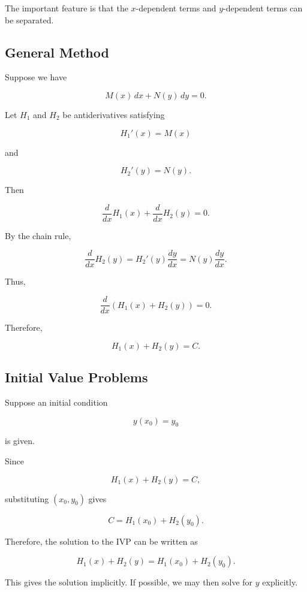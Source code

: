 \documentclass[11pt]{article}
\begin{document}
The important feature is that the $x$-dependent terms and
$y$-dependent terms can be separated.

\subsection{General Method}

Suppose we have

\[
M(x)\,dx+N(y)\,dy=0.
\]

Let $H_1$ and $H_2$ be antiderivatives satisfying

\[
H_1'(x)=M(x)
\]

and

\[
H_2'(y)=N(y).
\]

Then

\[
\frac{d}{dx}H_1(x)
+
\frac{d}{dx}H_2(y)=0.
\]

By the chain rule,

\[
\frac{d}{dx}H_2(y)
=
H_2'(y)\frac{dy}{dx}
=
N(y)\frac{dy}{dx}.
\]

Thus,

\[
\frac{d}{dx}
\left(
H_1(x)+H_2(y)
\right)
=0.
\]

Therefore,

\[
\boxed{
H_1(x)+H_2(y)=C
}.
\]

\subsection{Initial Value Problems}

Suppose an initial condition

\[
y(x_0)=y_0
\]

is given.

Since

\[
H_1(x)+H_2(y)=C,
\]

substituting $(x_0,y_0)$ gives

\[
C
=
H_1(x_0)+H_2(y_0).
\]

Therefore, the solution to the IVP can be written as

\[
\boxed{
H_1(x)+H_2(y)
=
H_1(x_0)+H_2(y_0)
}.
\]

This gives the solution implicitly. If possible, we may then solve
for $y$ explicitly.

\end{document}
